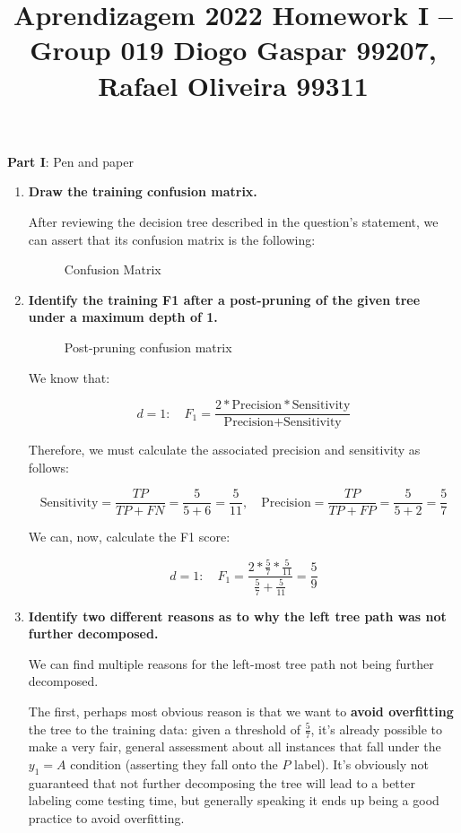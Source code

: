\documentclass[12pt]{article}
\title{\large{Aprendizagem 2022}\vskip 0.2cm Homework I -- Group 019\vskip 0.2cm Diogo Gaspar 99207, Rafael Oliveira 99311}
\date{}
\begin{document}
\maketitle
\center\large{\vskip -2.5cm\textbf{Part I}: Pen and paper}
\begin{enumerate}[leftmargin=\labelsep]
  \item \textbf{Draw the training confusion matrix.}

        After reviewing the decision tree described in the question's statement,
        we can assert that its confusion matrix is the following:

        \begin{figure}[htpb]
          \centering
          
          \caption{Confusion Matrix}
        \end{figure}

  \item \textbf{Identify the training F1 after a post-pruning of the given tree under a maximum depth of 1.}

        \begin{figure}[htpb]
          \centering
          
          \caption{Post-pruning confusion matrix}
        \end{figure}

        We know that:

        $$
          d = 1: \quad F_1 = \frac{2 * \text{Precision} * \text{Sensitivity}}{\text{Precision} + \text{Sensitivity}}
        $$

        Therefore, we must calculate the associated precision and sensitivity as follows:

        $$
          \text{Sensitivity} = \frac{TP}{TP + FN} = \frac{5}{5 + 6} = \frac{5}{11}, \quad \text{Precision} = \frac{TP}{TP + FP}= \frac{5}{5 + 2} = \frac{5}{7}
        $$

        We can, now, calculate the F1 score:

        $$
          d = 1: \quad F_1 = \frac{2 * \frac{5}{7} * \frac{5}{11}}{\frac{5}{7} + \frac{5}{11}} = \frac{5}{9}
        $$

  \item \textbf{Identify two different reasons as to why the left tree path was not further decomposed.}

        We can find multiple reasons for the left-most tree path not being further decomposed.

        The first, perhaps most obvious reason is that we want to \textbf{avoid overfitting} the
        tree to the training data: given a threshold of $\frac{5}{7}$, it's already possible
        to make a very fair, general assessment about all instances that fall under the $y_1 = A$
        condition (asserting they fall onto the $P$ label). It's obviously not guaranteed
        that not further decomposing the tree will lead to a better labeling come testing time,
        but generally speaking it ends up being a good practice to avoid overfitting.


\end{enumerate}
\end{document}

